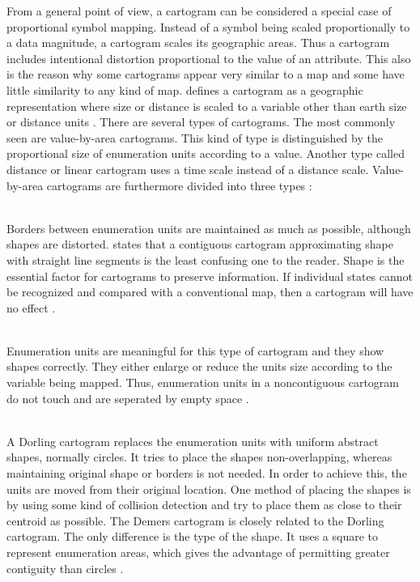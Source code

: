 From a general point of view, a cartogram can be considered a special case of proportional symbol mapping. Instead of a symbol being scaled proportionally to a data magnitude, a cartogram scales its geographic areas. Thus a cartogram includes intentional distortion proportional to the value of an attribute. This also is the reason why some cartograms appear very similar to a map and some have little similarity to any kind of map. \citeauthor{Tyner2010} defines a cartogram as a geographic representation where size or distance is scaled to a variable other than earth size or distance units .
There are several types of cartograms. The most commonly seen are value-by-area cartograms. This kind of type is distinguished by the proportional size of enumeration units according to a value. Another type called distance or linear cartogram uses a time scale instead of a distance scale. Value-by-area cartograms are furthermore divided into three types :

\begin{enumerate}

 \hfill \\
Borders between enumeration units are maintained as much as possible, although shapes are distorted. \citeauthor{Tyner2010} states that a contiguous cartogram approximating shape with straight line segments is the least confusing one to the reader. Shape is the essential factor for cartograms to preserve information. If individual states cannot be recognized and compared with a conventional map, then a cartogram will have no effect .

 \hfill \\
Enumeration units are meaningful for this type of cartogram and they show shapes correctly. They either enlarge or reduce the units size according to the variable being mapped. Thus, enumeration units in a noncontiguous cartogram do not touch and are seperated by empty space .

 \hfill \\
A Dorling cartogram replaces the enumeration units with uniform abstract shapes, normally circles. It tries to place the shapes non-overlapping, whereas maintaining original shape or borders is not needed. In order to achieve this, the units are moved from their original location. One method of placing the shapes is by using some kind of collision detection and try to place them as close to their centroid as possible. The Demers cartogram is closely related to the Dorling cartogram. The only difference is the type of the shape. It uses a square to represent enumeration areas, which gives the advantage of permitting greater contiguity than circles .

\end{enumerate}

